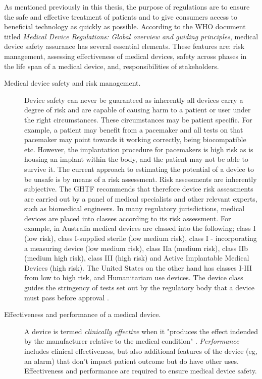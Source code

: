 \documentclass[12pt, openany, oneside]{book}
\begin{document}
As mentioned previously in this thesis, the purpose of regulations are to ensure the safe and effective treatment of patients and to give consumers access to beneficial technology as quickly as possible. According to the WHO document titled \textit{Medical Device Regulations: Global overview and guiding principles}, medical device safety assurance has several essential elements. These features are: risk management, assessing effectiveness of medical devices, safety across phases in the life span of a medical device, and, responsibilities of stakeholders.  

\begin{description}
	\item[Medical device safety and risk management.] Device safety can never be guaranteed as inherently all devices carry a degree of risk and are capable of causing harm to a patient or user under the right circumstances. These circumstances may be patient specific. For example, a patient may benefit from a pacemaker and all tests on that pacemaker may point towards it working correctly, being biocompatible etc. However, the implantation procedure for pacemakers is high risk as is housing an implant within the body, and the patient may not be able to survive it. The current approach to estimating the potential of a device to be unsafe is by means of a risk assessment. Risk assessments are inherently subjective. The GHTF recommends that therefore device risk assessments are carried out by a panel of medical specialists and other relevant experts, such as biomedical engineers. In many regulatory jurisdictions, medical devices are placed into classes according to its risk assessment. For example, in Australia medical devices are classed into the following; class I (low risk), class I-supplied sterile (low medium risk), class I - incorporating a measuring device (low medium risk), class IIa (medium risk), class IIb (medium high risk), class III (high risk) and Active Implantable Medical Devices (high risk). The United States on the other hand has classes I-III from low to high risk, and Humanitariam use devices. The device class guides the stringency of tests set out by the regulatory body that a device must pass before approval \citep{cheng2003, gupta2016medical}.
	\item[Effectiveness and performance of a medical device.]  A device is termed \textit{clinically effective} when it "produces the effect indended by the manufacturer relative to the medical condition" \citep{cheng2003}. \textit{Performance} includes clinical effectiveness, but also additional features of the device (eg, an alarm) that don't impact patient outcome but do have other uses. Effectiveness and performance are required to ensure medical device safety.

\end{description}
\end{document}
